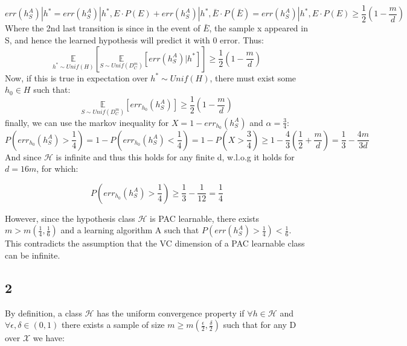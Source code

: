 \begin{equation*}
    \mathit{err}(h_S^A) | h^*  = \mathit{err}(h_S^A) | h^*, E \cdot P(E) + \mathit{err}(h_S^A) | h^*, \bar{E} \cdot P(\bar{E}) = \mathit{err}(h_S^A) | h^*, E \cdot P(E) \geq \frac{1}{2} (1-\frac{m}{d})
\end{equation*}
Where the 2nd last transition is since in the event of $\bar{E}$, the sample x appeared in S, and hence the learned hypothesis will predict it with 0 error. Thus:
\begin{equation*}
    \underset{h^* \sim Unif(H)}{\mathbb{E}} \left[\underset{S \sim Unif(D_C^m)}{\mathbb{E}}  \left[ \mathit{err}(h_S^A) | h^* \right] \right] \geq \frac{1}{2} (1-\frac{m}{d})
\end{equation*}
Now, if this is true in expectation over $h^* \sim Unif(H)$, there must exist some $h_0 \in H$ such that:
\begin{equation*}    
    \underset{S \sim Unif(D_C^m)}{\mathbb{E}}  \left[ err_{h_0}(h_S^A) \right] \geq \frac{1}{2} (1-\frac{m}{d})
\end{equation*}
finally, we can use the markov inequality for $X = 1 - err_{h_0}(h_S^A)$ and $\alpha = \frac{3}{4}$:
\begin{equation*}
    P(err_{h_0}(h_S^A) > \frac{1}{4}) = 1 - P(err_{h_0}(h_S^A) < \frac{1}{4}) = 1 - P(X > \frac{3}{4}) \geq 1 - \frac{4}{3}(\frac{1}{2} + \frac{m}{d}) = \frac{1}{3} - \frac{4m}{3d}
\end{equation*}
And since $\mathcal{H}$ is infinite and thus this holds for any finite d, w.l.o.g it holds for $d=16m$, for which:

\begin{equation*}
    P(err_{h_0}(h_S^A) > \frac{1}{4}) \geq \frac{1}{3} - \frac{1}{12} = \frac{1}{4}
\end{equation*}

However, since the hypothesis class $\mathcal{H}$ is PAC learnable, there exists $m > m(\frac{1}{4}, \frac{1}{6})$ and a learning algorithm A such that $P(\mathit{err}(h_S^A) > \frac{1}{4}) < \frac{1}{6}$.
This contradicts the assumption that the VC dimension of a PAC learnable class can be infinite.


\subsection*{2}
By definition, a class $\mathcal{H}$ has the uniform convergence property if $\forall h \in \mathcal{H}$ and $\forall \epsilon, \delta \in (0, 1)$ there exists a sample of size $m \geq m(\frac{\epsilon}{2}, \frac{\delta}{2})$ such that for any D over $\mathcal{X}$ we have:

